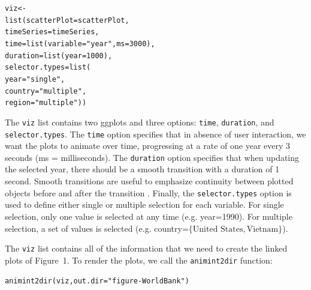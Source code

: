 \documentclass[12pt]{article}\usepackage[]{graphicx}\usepackage[]{color}
\makeatletter
\newcommand{\hlnum}[1]{\textcolor[rgb]{0,0,0}{#1}}%
\newcommand{\hlstr}[1]{\textcolor[rgb]{0.502,0,0}{#1}}%
\newcommand{\hlstd}[1]{\textcolor[rgb]{0,0,0}{#1}}%
\newcommand{\hlkwb}[1]{\textcolor[rgb]{0,0,0}{#1}}%
\newcommand{\hlkwc}[1]{\textcolor[rgb]{0,0,1}{#1}}%
\newcommand{\hlkwd}[1]{\textcolor[rgb]{0,0,0}{#1}}%
\newenvironment{kframe}{%
 \def\at@end@of@kframe{}%
 \ifinner\ifhmode%
  \def\at@end@of@kframe{\end{minipage}}%
  \begin{minipage}{\columnwidth}%
 \fi\fi%
 \def\FrameCommand##1{\hskip\@totalleftmargin \hskip-\fboxsep
 \colorbox{shadecolor}{##1}\hskip-\fboxsep
     \hskip-\linewidth \hskip-\@totalleftmargin \hskip\columnwidth}%
 \MakeFramed {\advance\hsize-\width
   \@totalleftmargin\z@ \linewidth\hsize
   \@setminipage}}%
 {\par\unskip\endMakeFramed%
 \at@end@of@kframe}
\newenvironment{knitrout}{}{} %
\makeatother
\begin{document}
\begin{knitrout}
\color{fgcolor}\begin{kframe}
\begin{alltt}
\hlstd{viz} \hlkwb{<-}
  \hlkwd{list}\hlstd{(}\hlkwc{scatterPlot}\hlstd{=scatterPlot,}
       \hlkwc{timeSeries}\hlstd{=timeSeries,}
       \hlkwc{time}\hlstd{=}\hlkwd{list}\hlstd{(}\hlkwc{variable}\hlstd{=}\hlstr{"year"}\hlstd{,} \hlkwc{ms}\hlstd{=}\hlnum{3000}\hlstd{),}
       \hlkwc{duration}\hlstd{=}\hlkwd{list}\hlstd{(}\hlkwc{year}\hlstd{=}\hlnum{1000}\hlstd{),}
       \hlkwc{selector.types}\hlstd{=}\hlkwd{list}\hlstd{(}
         \hlkwc{year}\hlstd{=}\hlstr{"single"}\hlstd{,}
         \hlkwc{country}\hlstd{=}\hlstr{"multiple"}\hlstd{,}
         \hlkwc{region}\hlstd{=}\hlstr{"multiple"}\hlstd{))}
\end{alltt}
\end{kframe}
\end{knitrout}

The \texttt{viz} list contains two ggplots and three options:
\texttt{time}, \texttt{duration}, and \texttt{selector.types}. The
\texttt{time} option specifies that in absence of user interaction, we
want the plots to animate over time, progressing at a rate of one year
every 3 seconds (ms = milliseconds). The \texttt{duration} option
specifies that when updating the selected year, there should be a
smooth transition with a duration of 1 second. Smooth transitions are
useful to emphasize continuity between plotted objects before and after the
transition \citep{animated-transitions}. Finally, the
\texttt{selector.types} option is used to define either single or
multiple selection for each variable. For single selection, only one
value is selected at any time (e.g. year=1990). For multiple
selection, a set of values is selected (e.g. country=$\{\textrm{United
  States}, \textrm{Vietnam}\}$).

The \texttt{viz} list contains all of the information that we need to
create the linked plots of Figure~1. To render the plots, we call the
\texttt{animint2dir} function:

\begin{knitrout}
\color{fgcolor}\begin{kframe}
\begin{alltt}
\hlkwd{animint2dir}\hlstd{(viz,} \hlkwc{out.dir}\hlstd{=}\hlstr{"figure-WorldBank"}\hlstd{)}
\end{alltt}
\end{kframe}
\end{knitrout}
\end{document}
